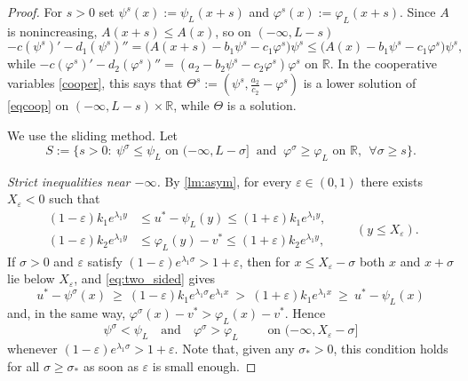 \documentclass[10pt,a4paper]{amsart}
\begin{document}
\begin{proof}
	For $s>0$ set $\psi^s(x):=\psi_L(x+s)$ and $\varphi^s(x):=\varphi_L(x+s)$.
	Since $A$ is nonincreasing, $A(x+s)\le A(x)$, so on $(-\infty,L-s)$
	\[
	-c(\psi^{s})' - d_1(\psi^{s})'' = \big(A(x+s)-b_1\psi^{s}-c_1\varphi^{s}\big)\psi^{s}
	\le \big(A(x)-b_1\psi^{s}-c_1\varphi^{s}\big)\psi^{s},
	\]
	while $-c(\varphi^{s})'-d_2(\varphi^{s})''=(a_2-b_2\psi^{s}-c_2\varphi^{s})\varphi^{s}$
	on $\mathbb{R}$. In the cooperative variables \eqref{cooper}, this says that
	$\Theta^{s}:=(\psi^{s},\frac{a_2}{c_2}-\varphi^{s})$ is a lower solution of
	\eqref{eqcoop} on $(-\infty,L-s)\times \mathbb{R}$, while $\Theta$ is a solution.

	We use the sliding method. Let
	\[
	S:=\Big\{s>0:\ \psi^{\sigma}\le\psi_L \text{ on }(-\infty,L-\sigma]\ \text{ and }\
	\varphi^{\sigma}\ge\varphi_L \text{ on }\mathbb{R},\ \ \forall\sigma\ge s\Big\}.
	\]

	\emph{Strict inequalities near $-\infty$.} By \cref{lm:asym}, for every
	$\varepsilon\in(0,1)$ there exists $X_\varepsilon<0$ such that
	\begin{equation}\label{eq:two_sided}
		\begin{aligned}
			(1-\varepsilon)k_1e^{\lambda_1y}&\le u^*-\psi_L(y)\le (1+\varepsilon)k_1e^{\lambda_1y},\\
			(1-\varepsilon)k_2e^{\lambda_1y}&\le \varphi_L(y)-v^*\le (1+\varepsilon)k_2e^{\lambda_1y},
		\end{aligned}
		\qquad (y\le X_\varepsilon).
	\end{equation}
	If $\sigma>0$ and $\varepsilon$ satisfy $(1-\varepsilon)e^{\lambda_1\sigma}>1+\varepsilon$,
	then for $x\le X_\varepsilon-\sigma$ both $x$ and $x+\sigma$ lie below
	$X_\varepsilon$, and \eqref{eq:two_sided} gives
	\[
	u^*-\psi^{\sigma}(x)\ \ge\ (1-\varepsilon)k_1e^{\lambda_1\sigma}e^{\lambda_1x}
	\ >\ (1+\varepsilon)k_1e^{\lambda_1x}\ \ge\ u^*-\psi_L(x)
	\]
	and, in the same way, $\varphi^{\sigma}(x)-v^*>\varphi_L(x)-v^*$. Hence
	\begin{equation}\label{eq:strict_minus}
		\psi^{\sigma}<\psi_L \quad\text{and}\quad \varphi^{\sigma}>\varphi_L
		\qquad\text{ on } (-\infty,X_\varepsilon-\sigma]
	\end{equation}
	whenever $(1-\varepsilon)e^{\lambda_1\sigma}>1+\varepsilon$. Note that, given
	any $\sigma_*>0$, this condition holds for all $\sigma\ge\sigma_*$ as soon as
	$\varepsilon$ is small enough.


\end{proof}
\end{document}
